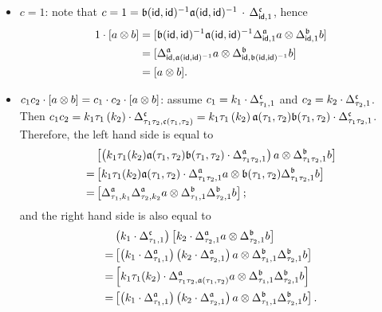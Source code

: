 \begin{construction}[$M$]
\begin{itemize}
  \item $c = 1$: note that $c = 1 = \mathfrak{b}(\mathsf{id},\mathsf{id})^{-1}\mathfrak{a}(\mathsf{id},\mathsf{id})^{-1}\,\cdot\,\Delta^{\mathfrak{c}}_{\mathsf{id}, 1}$, hence
        \[
        \begin{aligned}
          1 \cdot [a\otimes b]
          &= [\mathfrak{b}(\mathsf{id},\mathsf{id})^{-1}\mathfrak{a}(\mathsf{id},\mathsf{id})^{-1}\Delta^{\mathfrak{a}}_{\mathsf{id},1}a \otimes \Delta^{\mathfrak{b}}_{\mathsf{id}, 1}b] \\
          &= [\Delta^{\mathfrak{a}}_{\mathsf{id},\mathfrak{a}(\mathsf{id},\mathsf{id})^{-1}}a \otimes \Delta^{\mathfrak{b}}_{\mathsf{id},\mathfrak{b}(\mathsf{id},\mathsf{id})^{-1}}b] \\
          &= [a\otimes b].
        \end{aligned}
        \]
  \item $c_{1}c_{2}\cdot [a \otimes b] = c_{1}\cdot c_{2}\cdot [a\otimes b]$: assume $c_{1} = k_{1}\cdot\Delta^{\mathfrak{c}}_{\tau_{1}, 1}$ and $c_{2}=k_{2}\cdot\Delta^{\mathfrak{c}}_{\tau_{2},1}$. Then $c_{1}c_{2} = k_{1}\tau_{1}\left(k_{2}\right)\cdot \Delta^{\mathfrak{c}}_{\tau_{1}\tau_{2},\mathfrak{c}(\tau_{1},\tau_{2})} = k_{1}\tau_{1}\left(k_{2}\right)\mathfrak{a}(\tau_{1},\tau_{2})\mathfrak{b}(\tau_{1},\tau_{2})\cdot \Delta^{\mathfrak{c}}_{\tau_{1}\tau_{2},1}$.
        Therefore, the left hand side is equal to
        \[
        \begin{aligned}
          & \left[\left(k_{1}\tau_{1}(k_{2})\mathfrak{a}(\tau_{1},\tau_{2})\mathfrak{b}(\tau_{1},\tau_{2})\cdot \Delta^{\mathfrak{a}}_{\tau_{1}\tau_{2}, 1}\right)a \otimes \Delta^{\mathfrak{b}}_{\tau_{1}\tau_{2},1}b\right] \\
          =& \left[
             k_{1}\tau_{1}(k_{2})\mathfrak{a}(\tau_{1},\tau_{2})\cdot \Delta^{\mathfrak{a}}_{\tau_{1}\tau_{2},1} a \otimes \mathfrak{b}(\tau_{1},\tau_{2})\Delta^{\mathfrak{b}}_{\tau_{1}\tau_{2}, 1}b
             \right]\\
          =& \left[
             \Delta^{\mathfrak{a}}_{\tau_{1},k_{1}}\Delta^{\mathfrak{a}}_{\tau_{2},k_{2}} a \otimes
             \Delta^{\mathfrak{b}}_{\tau_{1},1}\Delta^{\mathfrak{b}}_{\tau_{2},1}b
             \right];
        \end{aligned}
        \]
        and the right hand side is also equal to
        \[
        \begin{aligned}
        &\left(k_{1}\cdot \Delta^{\mathfrak{c}}_{\tau_{1}, 1}\right)
        \left[
        k_{2}\cdot\Delta^{\mathfrak{a}}_{\tau_{2},1}a \otimes \Delta^{\mathfrak{b}}_{\tau_{2}, 1} b
          \right] \\
          =& \left[
             \left(k_{1}\cdot \Delta^{\mathfrak{a}}_{\tau_{1}, 1}\right)\left(k_{2}\cdot\Delta^{\mathfrak{a}}_{\tau_{2}, 1}\right)a \otimes
             \Delta^{\mathfrak{b}}_{\tau_{1},1}\Delta^{\mathfrak{b}}_{\tau_{2},1}b
             \right]\\
          =&\left[
           k_{1}\tau_{1}(k_{2})\cdot \Delta^{\mathfrak{a}}_{\tau_{1}\tau_{2},\mathfrak{a}(\tau_{1},\tau_{2})}a \otimes \Delta^{\mathfrak{b}}_{\tau_{1}, 1}\Delta^{\mathfrak{b}}_{\tau_{2},1}b
             \right]\\
          =&\left[
             \left(k_{1}\cdot \Delta^{\mathfrak{a}}_{\tau_{1}, 1}\right)\left(k_{2}\cdot\Delta^{\mathfrak{a}}_{\tau_{2}, 1}\right)a \otimes
             \Delta^{\mathfrak{b}}_{\tau_{1},1}\Delta^{\mathfrak{b}}_{\tau_{2},1}b
             \right].
          \end{aligned}
        \]
\end{itemize}


\end{construction}
